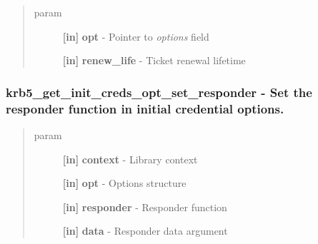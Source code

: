 \documentclass[letterpaper,10pt,english]{sphinxmanual}
\begin{document}
\begin{quote}\begin{description}
\item[{param}] \leavevmode
\textbf{{[}in{]}} \textbf{opt} - Pointer to \emph{options} field

\textbf{{[}in{]}} \textbf{renew\_life} - Ticket renewal lifetime

\end{description}\end{quote}


\subsubsection{krb5\_get\_init\_creds\_opt\_set\_responder -  Set the responder function in initial credential options.}
\label{appdev/refs/api/krb5_get_init_creds_opt_set_responder:krb5-get-init-creds-opt-set-responder-set-the-responder-function-in-initial-credential-options}\label{appdev/refs/api/krb5_get_init_creds_opt_set_responder::doc}

\begin{fulllineitems}
\label{appdev/refs/api/krb5_get_init_creds_opt_set_responder:c.krb5_get_init_creds_opt_set_responder}
\end{fulllineitems}

\begin{quote}\begin{description}
\item[{param}] \leavevmode
\textbf{{[}in{]}} \textbf{context} - Library context

\textbf{{[}in{]}} \textbf{opt} - Options structure

\textbf{{[}in{]}} \textbf{responder} - Responder function

\textbf{{[}in{]}} \textbf{data} - Responder data argument

\end{description}\end{quote}
\end{document}
